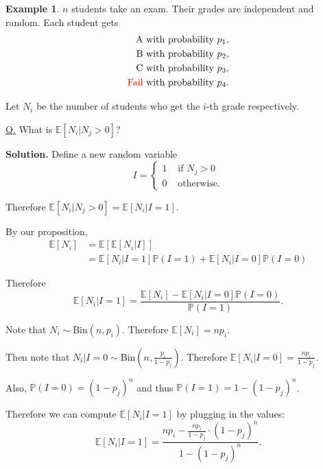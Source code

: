 \documentclass[a4paper,11pt]{amsbook}
\theoremstyle{definition}
\newtheorem{example}{\hspace{-2em} \color{darkblue} Example}[chapter]
\theoremstyle{remark}
\newcommand{\E}{\mathbb{E}}
\renewcommand{\P}{\mathbb{P}}
\newcommand\0{\varnothing}
\newcommand\Bin{\text{Bin}}
\begin{document}
\begin{example}
    $n$ students take an exam. Their grades are independent and random.
    Each student gets \begin{align*}
        \text{A} &\text{ with probability }p_1, \\
        \text{B} &\text{ with probability }p_2, \\
        \text{C} &\text{ with probability }p_3, \\
        \text{\color{red}Fail} &\text{ with probability }p_4.
    \end{align*}

    Let $N_i$ be the number of students who get the $i$-th grade respectively.
    
    \noindent \underline{Q.} What is $\E[N_i|N_j>0]$?

    \noindent \textbf{Solution.} Define a new random variable $$I=\begin{cases}
        1 & \text{ if }N_j>0 \\
        0 & \text{ otherwise.}
    \end{cases}$$

    Therefore $\E[N_i|N_j>0]=\E[N_i|I=1]$.

    By our proposition, \begin{align*}
        \E[N_i]&=\E[\E[N_i|I]] \\
        &=\E[N_i|I=1]\P(I=1)+\E[N_i|I=0]\P(I=0)
    \end{align*}

    Therefore $$\E[N_i|I=1]=\frac{\E[N_i]-\E[N_i|I=0]\P(I=0)}{\P(I=1)}.$$

    Note that $N_i\sim\Bin(n,p_i)$. Therefore $\E[N_i]=np_i$.

    Then note that $N_i|I=0\sim\Bin\left(n,\frac{p_i}{1-p_j}\right)$.
    Therefore $\E[N_i|I=0]=\frac{np_i}{1-p_j}$.

    Also, $\P(I=0)=(1-p_j)^n$ and thus $\P(I=1)=1-(1-p_j)^n$. 
    
    Therefore we can compute $\E[N_i|I=1]$ by plugging in the values:
    $$\E[N_i|I=1]=\frac{np_i-\frac{np_i}{1-p_j}\cdot(1-p_j)^n}{1-(1-p_j)^n}.$$
\end{example}
\end{document}
